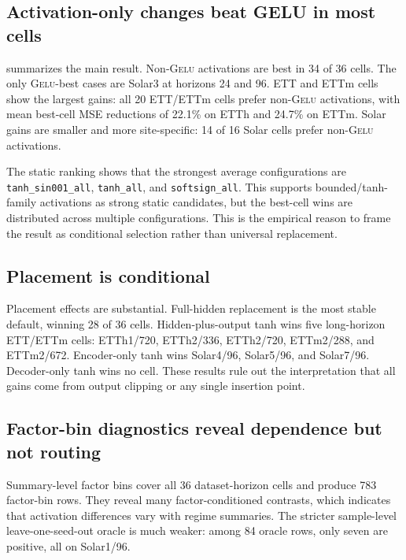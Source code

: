 \documentclass{article}
\newcommand{\gelu}{\textsc{Gelu}}
\begin{document}


\subsection{Activation-only changes beat GELU in most cells}

 summarizes the main result. Non-\gelu{} activations are best in 34 of 36 cells. The only \gelu{}-best cases are Solar3 at horizons 24 and 96. ETT and ETTm cells show the largest gains: all 20 ETT/ETTm cells prefer non-\gelu{} activations, with mean best-cell MSE reductions of 22.1\% on ETTh and 24.7\% on ETTm. Solar gains are smaller and more site-specific: 14 of 16 Solar cells prefer non-\gelu{} activations.



The static ranking shows that the strongest average configurations are \texttt{tanh\_sin001\_all}, \texttt{tanh\_all}, and \texttt{softsign\_all}. This supports bounded/tanh-family activations as strong static candidates, but the best-cell wins are distributed across multiple configurations. This is the empirical reason to frame the result as conditional selection rather than universal replacement.

\subsection{Placement is conditional}

Placement effects are substantial. Full-hidden replacement is the most stable default, winning 28 of 36 cells. Hidden-plus-output tanh wins five long-horizon ETT/ETTm cells: ETTh1/720, ETTh2/336, ETTh2/720, ETTm2/288, and ETTm2/672. Encoder-only tanh wins Solar4/96, Solar5/96, and Solar7/96. Decoder-only tanh wins no cell. These results rule out the interpretation that all gains come from output clipping or any single insertion point.

\subsection{Factor-bin diagnostics reveal dependence but not routing}

Summary-level factor bins cover all 36 dataset-horizon cells and produce 783 factor-bin rows. They reveal many factor-conditioned contrasts, which indicates that activation differences vary with regime summaries. The stricter sample-level leave-one-seed-out oracle is much weaker: among 84 oracle rows, only seven are positive, all on Solar1/96.
\end{document}
